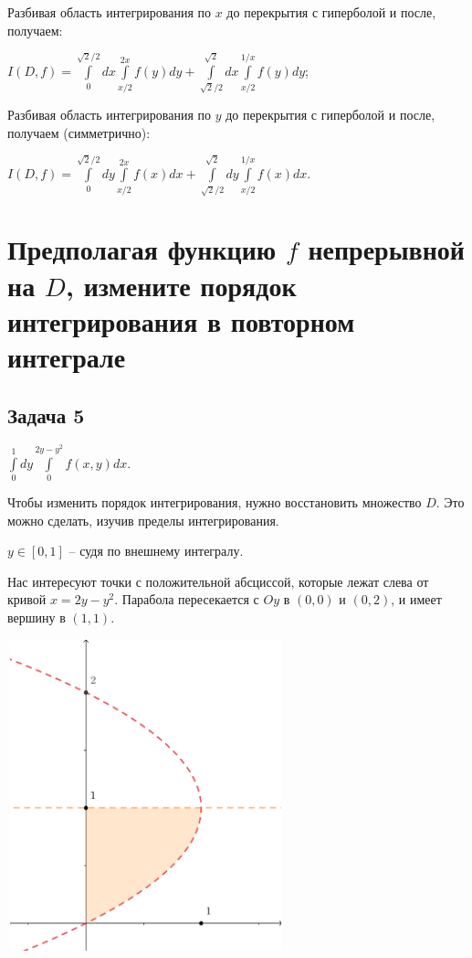 \documentclass[a4paper, fleqn]{article}
\begin{document}
    Разбивая область интегрирования по $x$ до перекрытия с гиперболой и после, получаем:
    
    $I(D, f) = \displaystyle \int\limits_{0}^{\sqrt{2}/2}dx \int\limits_{x/2}^{2x} f(y)dy + \displaystyle \int\limits_{\sqrt{2}/2}^{\sqrt{2}}dx \int\limits_{x/2}^{1/x} f(y)dy$;
    
    Разбивая область интегрирования по $y$ до перекрытия с гиперболой и после, получаем (симметрично):
    
    $I(D, f) = \displaystyle \int\limits_{0}^{\sqrt{2}/2}dy \int\limits_{x/2}^{2x} f(x)dx + \displaystyle \int\limits_{\sqrt{2}/2}^{\sqrt{2}}dy \int\limits_{x/2}^{1/x} f(x)dx$.
    
    \section*{Предполагая функцию $f$ непрерывной на $D$, измените порядок интегрирования в повторном интеграле}
    \subsection*{Задача 5}
    
    $\int\limits_{0}^{1} dy \int\limits_{0}^{2y - y^2} f(x,y)dx.$
    
    Чтобы изменить порядок интегрирования, нужно восстановить множество $D$. Это можно сделать, изучив пределы интегрирования.
    
    $y \in [0, 1]$ -- судя по внешнему интегралу.
    
    Нас интересуют точки с положительной абсциссой, которые лежат слева от кривой $x = 2y - y^2.$ Парабола пересекается с $Oy$ в $(0, 0)$ и $(0,2)$, и имеет вершину  в $(1,1).$
    
    \includegraphics[width=8cm, height=9cm]{task_5.png}
\end{document}
